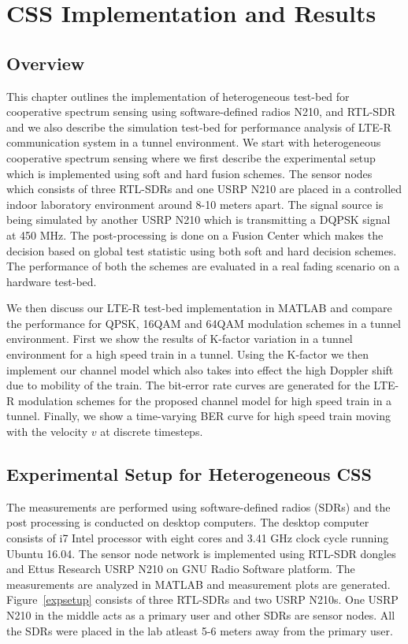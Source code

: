 \chapter{CSS Implementation and Results}
\label{chapter5}

\section{Overview}
This chapter outlines the implementation of heterogeneous test-bed for cooperative spectrum sensing using software-defined radios N210, and RTL-SDR and we also describe the simulation test-bed for performance analysis of LTE-R communication system in a tunnel environment. We start with heterogeneous cooperative spectrum sensing where we first describe the experimental setup which is implemented using soft and hard fusion schemes. The sensor nodes which consists of three RTL-SDRs and one USRP N210 are placed in a controlled indoor laboratory environment around 8-10 meters apart. The signal source is being simulated by another USRP N210 which is transmitting a DQPSK signal at 450 MHz. The post-processing is done on a Fusion Center which makes the decision based on global test statistic using both soft and hard decision schemes. The performance of both the schemes are evaluated in a real fading scenario on a hardware test-bed. 

We then discuss our LTE-R test-bed implementation in MATLAB and compare the performance for QPSK, 16QAM and 64QAM modulation schemes in a tunnel environment. First we show the results of K-factor variation in a tunnel environment for a high speed train in a tunnel. Using the K-factor we then implement our channel model which also takes into effect the high Doppler shift due to mobility of the train. The bit-error rate curves are generated for the LTE-R modulation schemes for the proposed channel model for high speed train in a tunnel. Finally, we show a time-varying BER curve for high speed train moving with the velocity $v$ at discrete timesteps.


\section{Experimental Setup for Heterogeneous CSS}

The measurements are performed using software-defined radios (SDRs) and the post processing is conducted on desktop computers. The desktop computer consists of i7 Intel processor with eight cores and 3.41 GHz clock cycle running Ubuntu 16.04. The sensor node network is implemented using RTL-SDR dongles and Ettus Research USRP N210 on GNU Radio Software platform. The measurements are analyzed in MATLAB and measurement plots are generated. Figure~\ref{expsetup} consists of three RTL-SDRs and two USRP N210s. One USRP N210 in the middle acts as a primary user and other SDRs are sensor nodes. All the SDRs were placed in the lab atleast 5-6  meters away from the primary user.

